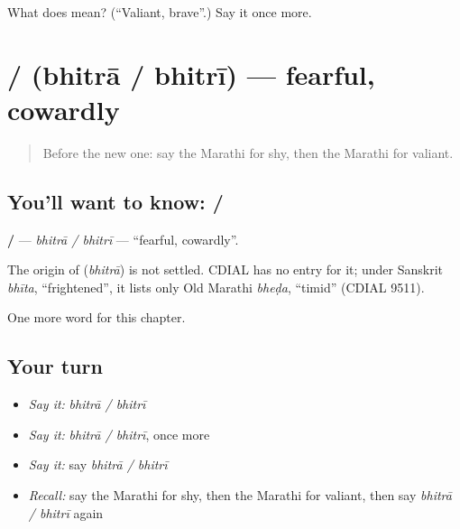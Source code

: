 \begin{tcolorbox}[breakable,colback=teal!4,colframe=teal!35!black,title={Before you move on}]
What does  mean? (\textquotedblleft{}Valiant, brave\textquotedblright{}.) Say it once more.
\end{tcolorbox}
\section[\texorpdfstring{\mr{भित्रा} / \mr{भित्री} (bhitrā / bhitrī)}{भित्रा / भित्री (bhitrā / bhitrī)}]{ /  (bhitrā / bhitrī) — fearful, cowardly}

\label{lesson:MR-C204-bhitra}



\begin{quote}
Before the new one: say the Marathi for shy, then the Marathi for valiant.
\end{quote}

\subsection*{You'll want to know:  / }
\textbf{ / } — \emph{bhitrā / bhitrī} — \textquotedblleft{}fearful, cowardly\textquotedblright{}.

\begin{cousinweb}
The origin of \textbf{} (\emph{bhitrā}) is not settled. CDIAL has no entry for it; under Sanskrit \emph{bhīta}, \textquotedblleft{}frightened\textquotedblright{}, it lists only Old Marathi \emph{bheḍa}, \textquotedblleft{}timid\textquotedblright{} (CDIAL 9511).
\end{cousinweb}

\begin{grammarlens}[title={What you've built}]
One more word for this chapter.
\end{grammarlens}

\subsection*{Your turn}
\begin{itemize}
\raggedright
  \item \emph{Say it:} \emph{bhitrā / bhitrī}
  \item \emph{Say it:} \emph{bhitrā / bhitrī}, once more
  \item \emph{Say it:} say \emph{bhitrā / bhitrī}
  \item \emph{Recall:} say the Marathi for shy, then the Marathi for valiant, then say \emph{bhitrā / bhitrī} again
\end{itemize}

